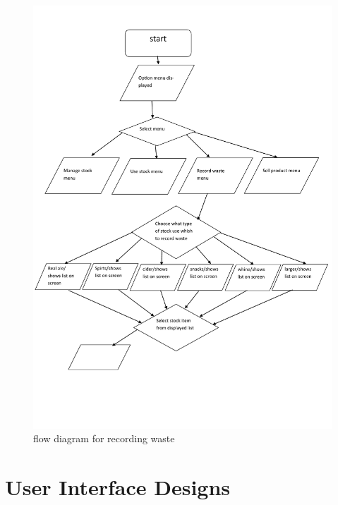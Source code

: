 \begin{figure}[H]
    \includegraphics[width=\textwidth]{./Design/pdfimages/flowdiagram_record_waste.pdf}
    \caption{flow diagram for recording waste} \label{fig:record waste flowdiagram}
\end{figure}



\section{User Interface Designs}

